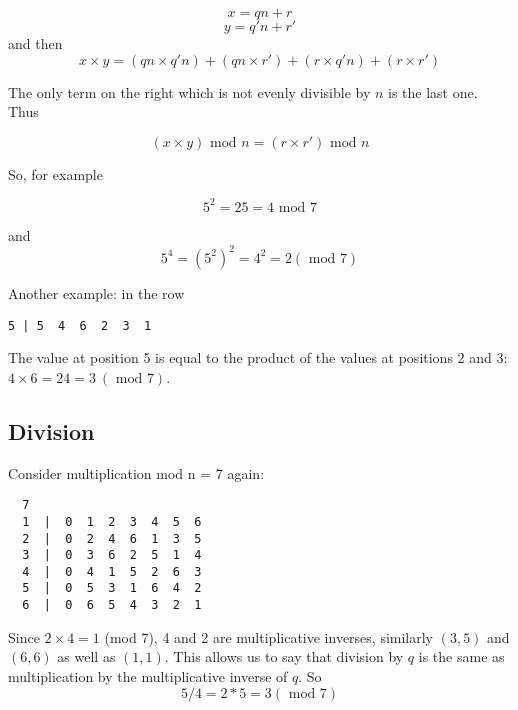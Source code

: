 \documentclass[11pt, oneside]{article}
\begin{document}
\[ x = qn + r \]
\[ y = q'n + r' \]
and then
\[ x \times y = (qn \times q'n) + (qn \times r') + (r \times q'n) + (r \times r') \]

The only term on the right which is not evenly divisible by $n$ is the last one.  Thus

\[ (x \times y)  \text{ mod } n = (r \times r')  \text{ mod } n \]

So, for example 

\[ 5^2 = 25 = 4 \text{ mod } 7 \]

and 
\[ 5^4 = (5^2)^2 = 4^2 = 2 (\text{ mod } 7) \]

Another example:  in the row

\begin{verbatim}
5 | 5  4  6  2  3  1
\end{verbatim}

The value at position 5 is equal to the product of the values at positions 2 and 3:  $4 \times 6 = 24 = 3 \ (\text{ mod } 7)$.

\subsection*{Division}

Consider multiplication mod n = 7 again:

\begin{verbatim}
  7
  1  |  0  1  2  3  4  5  6
  2  |  0  2  4  6  1  3  5
  3  |  0  3  6  2  5  1  4
  4  |  0  4  1  5  2  6  3
  5  |  0  5  3  1  6  4  2
  6  |  0  6  5  4  3  2  1
\end{verbatim}

Since $2 \times 4 = 1$ (mod 7), 4 and 2 are multiplicative inverses, similarly $(3,5)$ and $(6,6)$ as well as $(1,1)$.  This allows us to say that division by $q$ is the same as multiplication by the multiplicative inverse of $q$.  So
\[  5 / 4 = 2 * 5 = 3 (\text{ mod } 7) \]
\end{document}
